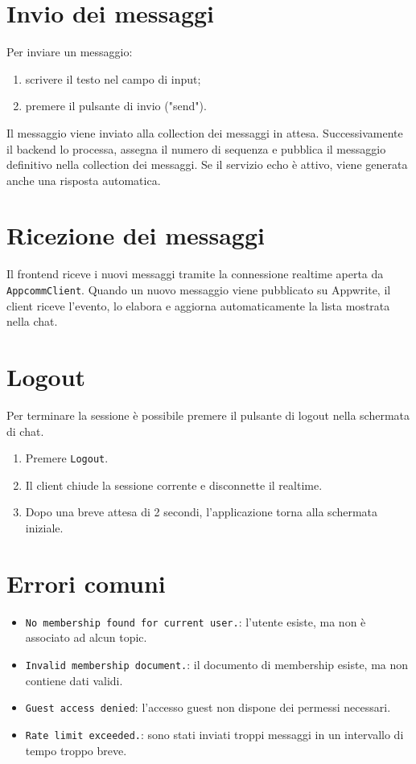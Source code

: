 \documentclass[a4paper, 11pt, twoside]{report}
\begin{document}
\section{Invio dei messaggi}

\noindent Per inviare un messaggio:

\begin{enumerate}
    \item scrivere il testo nel campo di input;
    \item premere il pulsante di invio ("send").
\end{enumerate}

\noindent Il messaggio viene inviato alla collection dei messaggi in attesa. Successivamente il backend lo processa, assegna il numero di sequenza e pubblica il messaggio definitivo nella collection dei messaggi. Se il servizio echo è attivo, viene generata anche una risposta automatica.

\section{Ricezione dei messaggi}

Il frontend riceve i nuovi messaggi tramite la connessione realtime aperta da \texttt{AppcommClient}. Quando un nuovo messaggio viene pubblicato su Appwrite, il client riceve l'evento, lo elabora e aggiorna automaticamente la lista mostrata nella chat.

\section{Logout}

\noindent Per terminare la sessione è possibile premere il pulsante di logout nella schermata di chat.

\begin{enumerate}
    \item Premere \texttt{Logout}.
    \item Il client chiude la sessione corrente e disconnette il realtime.
    \item Dopo una breve attesa di 2 secondi, l'applicazione torna alla schermata iniziale.
\end{enumerate}

\section{Errori comuni}

\begin{itemize}
    \item \texttt{No membership found for current user.}: l'utente esiste, ma non è associato ad alcun topic.
    \item \texttt{Invalid membership document.}: il documento di membership esiste, ma non contiene dati validi.
    \item \texttt{Guest access denied}: l'accesso guest non dispone dei permessi necessari.
    \item \texttt{Rate limit exceeded.}: sono stati inviati troppi messaggi in un intervallo di tempo troppo breve.
\end{itemize}
\end{document}
